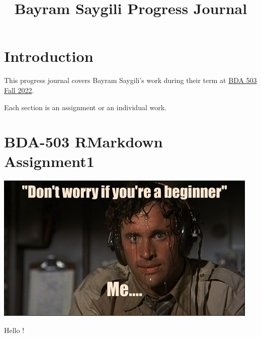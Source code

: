 \documentclass[
  letterpaper,
  DIV=11,
  numbers=noendperiod]{scrreprt}
\title{Bayram Saygili Progress Journal}
\author{}
\date{}
\renewcommand*\contentsname{Table of contents}
\newcommand\contentsname{Table of contents}
\begin{document}
\maketitle
\ifdefined\Shaded\renewenvironment{Shaded}{\begin{tcolorbox}[borderline west={3pt}{0pt}{shadecolor}, enhanced, frame hidden, sharp corners, breakable, interior hidden, boxrule=0pt]}{\end{tcolorbox}}\fi

\renewcommand*\contentsname{Table of contents}
{
\hypersetup{linkcolor=}
\setcounter{tocdepth}{2}
\tableofcontents
}

\hypertarget{introduction}{%
\chapter*{Introduction}\label{introduction}}


This progress journal covers Bayram Saygili's work during their term at
\href{https://mef-bda503.github.io/fall22/}{BDA 503 Fall 2022}.

Each section is an assignment or an individual work.


\hypertarget{bda-503-rmarkdown-assignment1}{%
\chapter{\texorpdfstring{\textbf{BDA-503 RMarkdown
Assignment1}}{BDA-503 RMarkdown Assignment1}}\label{bda-503-rmarkdown-assignment1}}

\includegraphics{./beginner.jpg}

Hello !
\end{document}
